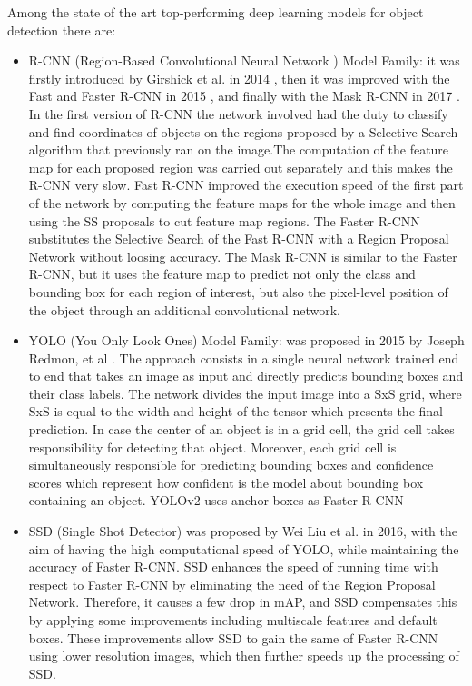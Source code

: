 \documentclass[a4paper,10pt]{report}
\begin{document}
Among the state of the art top-performing deep learning models for object detection there are:
\begin{itemize}
\item R-CNN (Region-Based Convolutional Neural Network ) Model Family: it was firstly introduced by Girshick et al. in 2014 \cite{rcnn}, then it was improved with the Fast \cite{fast-rcnn} and Faster R-CNN in 2015 \cite{faster-rcnn}, and finally with the Mask R-CNN in 2017 \cite{mask-rcnn}.
In the first version of R-CNN the network involved had the duty to classify and find coordinates of objects on the regions proposed by a Selective Search algorithm that previously ran on the image.The computation of the feature map for each proposed region was carried out separately and this makes the R-CNN very slow. Fast R-CNN improved the execution speed of the first part of the network by computing the feature maps for the whole image and then using the SS proposals to cut feature map regions. The Faster R-CNN \cite{faster-rcnn} substitutes the Selective 
Search of the Fast R-CNN with a Region Proposal Network without loosing accuracy. The Mask R-CNN is similar to the Faster R-CNN, but it uses the feature map to predict not only the class and bounding box for each region of interest, but also the pixel-level position of the object through an additional convolutional network. 
\item YOLO (You Only Look Ones) Model Family: was proposed in 2015 by Joseph Redmon, et al \cite{yolo}.
 The approach consists in a single neural network trained end to end that takes an image as input and directly predicts bounding boxes and their class labels.
 The network divides the input image into a SxS grid, where SxS is equal to the width and height of the tensor which presents the final prediction. 
 In case the center of an object is in a grid cell, the grid cell takes responsibility for detecting that object. Moreover, each grid cell is simultaneously 
 responsible for predicting bounding boxes and confidence scores which represent how confident is the model about bounding box containing an object. YOLOv2 uses anchor boxes as Faster R-CNN
\item SSD (Single Shot Detector) was proposed by Wei Liu et al. \cite{ssd} in 2016, with the aim of having the high computational speed of YOLO, while maintaining the accuracy of Faster R-CNN. 
SSD enhances the speed of running time with respect to Faster R-CNN by eliminating the need of the Region Proposal Network. Therefore, it causes a few drop in mAP, and SSD compensates this by applying some improvements including multiscale features and default boxes.
 These improvements allow SSD to gain the same of Faster R-CNN using lower resolution images, which then further speeds up the processing of SSD.
\end{itemize}
\end{document}
